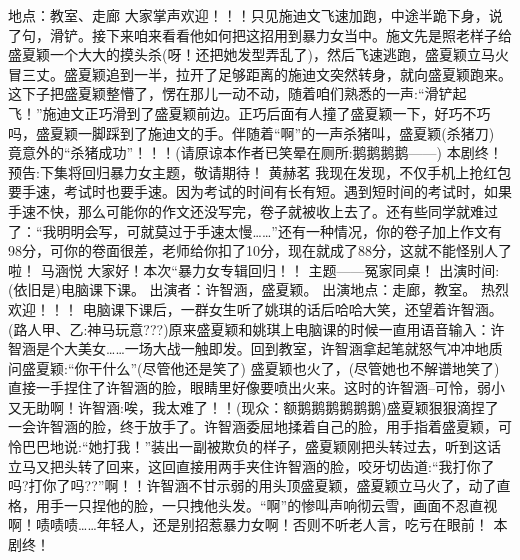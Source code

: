 {}地点：教室、走廊 \markdownRendererInterblockSeparator
{}大家掌声欢迎！！！只见施迪文飞速加跑，中途半跪下身，说了句，滑铲\markdownRendererTilde{}\markdownRendererTilde{}\markdownRendererTilde{}。接下来咱来看看他如何把这招用到暴力女当中。施文先是照老样子给盛夏颖一个大大的摸头杀(呀！还把她发型弄乱了)，然后飞速逃跑，盛夏颖立马火冒三丈。盛夏颖追到一半，拉开了足够距离的施迪文突然转身，就向盛夏颖跑来。这下子把盛夏颖整懵了，愣在那儿一动不动，随着咱们熟悉的一声:“滑铲\markdownRendererTilde{}起飞！”施迪文正巧滑到了盛夏颖前边。正巧后面有人撞了盛夏颖一下，好巧不巧吗，盛夏颖一脚踩到了施迪文的手。伴随着“啊”的一声杀猪叫，盛夏颖(杀猪刀) 竟意外的“杀猪成功”！！！(请原谅本作者已笑晕在厕所:鹅鹅鹅鹅——) \markdownRendererInterblockSeparator
{}本剧终！ \markdownRendererInterblockSeparator
{}预告:下集将回归暴力女主题，敬请期待！\markdownRendererInterblockSeparator
{}\markdownRendererInterblockSeparator
{}黄赫茗\markdownRendererInterblockSeparator
{}我现在发现，不仅手机上抢红包要手速，考试时也要手速。因为考试的时间有长有短。遇到短时间的考试时，如果手速不快，那么可能你的作文还没写完，卷子就被收上去了。还有些同学就难过了：“我明明会写，可就莫过于手速太慢……”还有一种情况，你的卷子加上作文有98分，可你的卷面很差，老师给你扣了10分，现在就成了88分，这就不能怪别人了啦！\markdownRendererInterblockSeparator
{}\markdownRendererInterblockSeparator
{}马涵悦\markdownRendererInterblockSeparator
{}大家好！本次“暴力女专辑回归！！ 主题——冤家同桌！\markdownRendererInterblockSeparator
{}出演时间:(依旧是)电脑课下课。 出演者：许智涵，盛夏颖。\markdownRendererInterblockSeparator
{}出演地点：走廊，教室。 热烈欢迎！！！\markdownRendererInterblockSeparator
{}电脑课下课后，一群女生听了姚琪的话后哈哈大笑，还望着许智涵。(路人甲、乙:神马玩意???)原来盛夏颖和姚琪上电脑课的时候一直用语音输入：许智涵是个大美女……一场大战一触即发。回到教室，许智涵拿起笔就怒气冲冲地质问盛夏颖:“你干什么”(尽管他还是笑了) 盛夏颖也火了，(尽管她也不解谱地笑了)直接一手捏住了许智涵的脸，眼睛里好像要喷出火来。这时的许智涵--可怜，弱小又无助啊！许智涵:唉，我太难了！！(现众：额鹅鹅鹅鹅鹅鹅\markdownRendererTilde{}\markdownRendererTilde{})盛夏颖狠狠滴捏了一会许智涵的脸，终于放手了。许智涵委屈地揉着自己的脸，用手指着盛夏颖，可怜巴巴地说:“她打我！”装出一副被欺负的样子，盛夏颖刚把头转过去，听到这话立马又把头转了回来，这回直接用两手夹住许智涵的脸，咬牙切齿道:“我打你了吗?打你了吗??”啊！！许智涵不甘示弱的用头顶盛夏颖，盛夏颖立马火了，动了直格，用手一只捏他的脸，一只拽他头发。“啊\markdownRendererTilde{}\markdownRendererTilde{}\markdownRendererTilde{}”的惨叫声响彻云雪，画面不忍直视啊！啧啧啧……年轻人，还是别招惹暴力女啊！否则不听老人言，吃亏在眼前！ 本剧终！\markdownRendererInterblockSeparator
